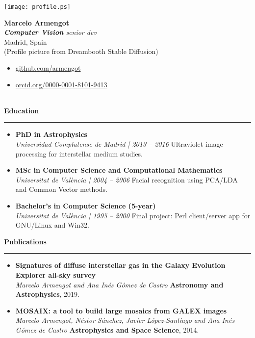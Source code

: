 \documentclass[10pt,a4paper]{article}
\newcommand{\sect}[1]{\vspace{6pt}\noindent\textbf{\large #1}\vspace{2pt}\hrule\vspace{6pt}}
\newcommand{\subsect}[1]{\vspace{4pt}\textbf{#1}}
\begin{document}
\pagestyle{empty}

\begin{center}
\begin{minipage}[c]{0.25\textwidth}
    \texttt{[image: profile.ps]}
\end{minipage}
\hfill
\begin{minipage}[c]{0.7\textwidth}
    {\LARGE \textbf{Marcelo Armengot}} \\[4pt]
    \textit{\textbf{Computer Vision} senior dev} \\[4pt]
    Madrid, Spain \\[4pt]
    (Profile picture from Dreambooth Stable Diffusion) \\
    \begin{itemize}[leftmargin=*,label={}]
      \item \href{https://github.com/armengot}{github.com/armengot}
      \item \href{https://orcid.org/0000-0001-8101-9413}{orcid.org/0000-0001-8101-9413}
    \end{itemize}
\end{minipage}
\end{center}

~\\

\sect{Education}
\begin{itemize}[leftmargin=*]
  \item \subsect{PhD in Astrophysics}\\
    \textit{Universidad Complutense de Madrid | 2013 – 2016}
    Ultraviolet image processing for interstellar medium studies.

  \item \subsect{MSc in Computer Science and Computational Mathematics}\\
    \textit{Universitat de València | 2004 – 2006}
    Facial recognition using PCA/LDA and Common Vector methods.

  \item \subsect{Bachelor's in Computer Science (5-year)}\\
    \textit{Universitat de València | 1995 – 2000}
    Final project: Perl client/server app for GNU/Linux and Win32.
\end{itemize}

\sect{Publications}
\begin{itemize}[leftmargin=*]
    \item \textbf{Signatures of diffuse interstellar gas in the Galaxy Evolution Explorer all-sky survey} \\
    \textit{Marcelo Armengot and Ana Inés Gómez de Castro} \textbf{Astronomy and Astrophysics}, 2019.
    
    \item \textbf{MOSAIX: a tool to build large mosaics from GALEX images} \\
    \textit{Marcelo Armengot, Néstor Sánchez, Javier López-Santiago and Ana Inés Gómez de Castro} \textbf{Astrophysics and Space Science}, 2014.
\end{itemize}
\end{document}
